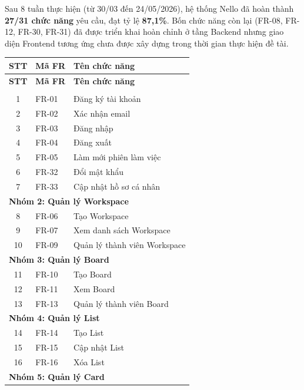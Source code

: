 Sau 8 tuần thực hiện (từ 30/03 đến 24/05/2026), hệ thống Nello đã hoàn thành \textbf{27/31 chức năng} yêu cầu, đạt tỷ lệ \textbf{87,1\%}. Bốn chức năng còn lại (FR-08, FR-12, FR-30, FR-31) đã được triển khai hoàn chỉnh ở tầng Backend nhưng giao diện Frontend tương ứng chưa được xây dựng trong thời gian thực hiện đề tài.

\begin{longtable}{|c|p{2.5cm}|p{9cm}|}
\hline
\textbf{STT} & \textbf{Mã FR} & \textbf{Tên chức năng} \\
\hline
\endfirsthead
\hline
\textbf{STT} & \textbf{Mã FR} & \textbf{Tên chức năng} \\
\hline
\endhead
\hline
\endfoot

\multicolumn{3}{|l|}{\cellcolor{gray!20}\textbf{Nhóm 1: Xác thực và quản lý tài khoản}} \\
\hline
1 & FR-01 & Đăng ký tài khoản \\
\hline
2 & FR-02 & Xác nhận email \\
\hline
3 & FR-03 & Đăng nhập \\
\hline
4 & FR-04 & Đăng xuất \\
\hline
5 & FR-05 & Làm mới phiên làm việc \\
\hline
6 & FR-32 & Đổi mật khẩu \\
\hline
7 & FR-33 & Cập nhật hồ sơ cá nhân \\
\hline
\multicolumn{3}{|l|}{\cellcolor{gray!20}\textbf{Nhóm 2: Quản lý Workspace}} \\
\hline
8 & FR-06 & Tạo Workspace \\
\hline
9 & FR-07 & Xem danh sách Workspace \\
\hline
10 & FR-09 & Quản lý thành viên Workspace \\
\hline
\multicolumn{3}{|l|}{\cellcolor{gray!20}\textbf{Nhóm 3: Quản lý Board}} \\
\hline
11 & FR-10 & Tạo Board \\
\hline
12 & FR-11 & Xem Board \\
\hline
13 & FR-13 & Quản lý thành viên Board \\
\hline
\multicolumn{3}{|l|}{\cellcolor{gray!20}\textbf{Nhóm 4: Quản lý List}} \\
\hline
14 & FR-14 & Tạo List \\
\hline
15 & FR-15 & Cập nhật List \\
\hline
16 & FR-16 & Xóa List \\
\hline
\multicolumn{3}{|l|}{\cellcolor{gray!20}\textbf{Nhóm 5: Quản lý Card}} \\

\end{longtable}
